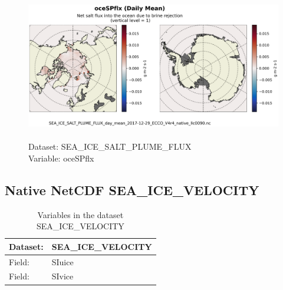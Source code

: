 \begin{figure}[H]
\centering
\includegraphics[scale=0.5]{../images/plots/native_plots/Sea-Ice_Salt_Plume_Fluxes/oceSPflx.png}
\caption{\\Dataset: SEA\_ICE\_SALT\_PLUME\_FLUX\\Variable: oceSPflx}
\label{tab:table-SEA_ICE_SALT_PLUME_FLUX_oceSPflx-Plot}
\end{figure}
\pagebreak
\subsection{Native NetCDF SEA\_ICE\_VELOCITY}
\newp
\begin{longtable}{|p{}|p{}|}
\caption{Variables in the dataset SEA\_ICE\_VELOCITY}
\label{tab:table-SEA_ICE_VELOCITY-fields} \\ 
\hline \endhead \hline \endfoot
\rowcolor{lightgray} \textbf{Dataset:} & \textbf{SEA\_ICE\_VELOCITY} \\ \hline
Field: &SIuice \\ \hline
Field: &SIvice \\ \hline
\end{longtable}

\pagebreak
